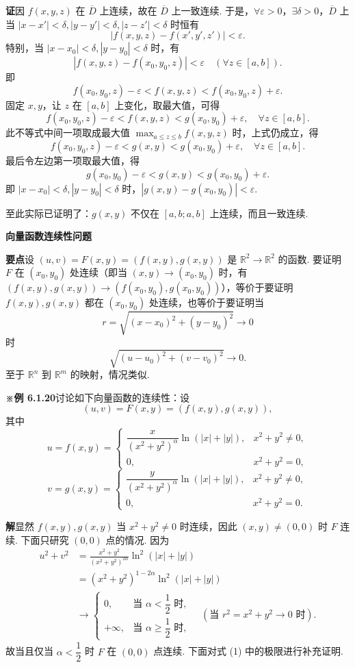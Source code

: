 \documentclass[UTF8,12pt,a4paper,fontset=fandol]{ctexart}
\begin{document}
\noindent\textbf{证}\quad 因 $f(x,y,z)$ 在 $\overline D$ 上连续，故在 $\overline D$ 上一致连续. 于是，$\forall\varepsilon>0$，$\exists\delta>0$，$\overline D$ 上当 $|x-x'|<\delta,|y-y'|<\delta,|z-z'|<\delta$ 时恒有
\[
  |f(x,y,z)-f(x',y',z')|<\varepsilon.
\]
特别，当 $|x-x_0|<\delta,|y-y_0|<\delta$ 时，有
\[
  |f(x,y,z)-f(x_0,y_0,z)|<\varepsilon\quad(\forall z\in[a,b]).
\]
即
\[
  f(x_0,y_0,z)-\varepsilon<f(x,y,z)<f(x_0,y_0,z)+\varepsilon.
\]
固定 $x,y$，让 $z$ 在 $[a,b]$ 上变化，取最大值，可得
\[
  f(x_0,y_0,z)-\varepsilon<f(x,y,z)<g(x_0,y_0)+\varepsilon,
  \quad \forall z\in[a,b].
\]
此不等式中间一项取成最大值 $\displaystyle\max_{a\le z\le b}f(x,y,z)$ 时，上式仍成立，得
\[
  f(x_0,y_0,z)-\varepsilon<g(x,y)<g(x_0,y_0)+\varepsilon,\quad \forall z\in[a,b].
\]
最后令左边第一项取最大值，得
\[
  g(x_0,y_0)-\varepsilon<g(x,y)<g(x_0,y_0)+\varepsilon.
\]
即 $|x-x_0|<\delta,|y-y_0|<\delta$ 时，$|g(x,y)-g(x_0,y_0)|<\varepsilon$.

至此实际已证明了：$g(x,y)$ 不仅在 $[a,b;a,b]$ 上连续，而且一致连续.

\noindent\textbf{向量函数连续性问题}

\noindent\textbf{要点}\quad 设 $(u,v)=F(x,y)=(f(x,y),g(x,y))$ 是 $\mathbb{R}^2\to\mathbb{R}^2$ 的函数. 要证明 $F$ 在 $(x_0,y_0)$ 处连续（即当 $(x,y)\to(x_0,y_0)$ 时，有 $(f(x,y),g(x,y))\to(f(x_0,y_0),g(x_0,y_0))$），等价于要证明 $f(x,y),g(x,y)$ 都在 $(x_0,y_0)$ 处连续，也等价于要证明当
\[
  r=\sqrt{(x-x_0)^2+(y-y_0)^2}\to0
\]
时
\[
  \sqrt{(u-u_0)^2+(v-v_0)^2}\to0.
\]
至于 $\mathbb{R}^n$ 到 $\mathbb{R}^m$ 的映射，情况类似.

\noindent\textbf{※例 6.1.20}\quad 讨论如下向量函数的连续性：设
\[
  (u,v)=F(x,y)=(f(x,y),g(x,y)),
\]
其中
\[
u=f(x,y)=
\begin{cases}
\dfrac{x}{(x^2+y^2)^\alpha}\ln(|x|+|y|), & x^2+y^2\ne0,\\
0, & x^2+y^2=0,
\end{cases}
\]
\[
v=g(x,y)=
\begin{cases}
\dfrac{y}{(x^2+y^2)^\alpha}\ln(|x|+|y|), & x^2+y^2\ne0,\\
0, & x^2+y^2=0.
\end{cases}
\]

\noindent\textbf{解}\quad 显然 $f(x,y),g(x,y)$ 当 $x^2+y^2\ne0$ 时连续，因此 $(x,y)\ne(0,0)$ 时 $F$ 连续. 下面只研究 $(0,0)$ 点的情况. 因为
\begin{equation}
\begin{aligned}
u^2+v^2
&=\frac{x^2+y^2}{(x^2+y^2)^{2\alpha}}\ln^2(|x|+|y|)\\
&=(x^2+y^2)^{1-2\alpha}\ln^2(|x|+|y|)\\
&\to
\begin{cases}
0, & \text{当 }\alpha<\dfrac12\text{ 时},\\
+\infty, & \text{当 }\alpha\ge\dfrac12\text{ 时},
\end{cases}
\quad(\text{当 }r^2=x^2+y^2\to0\text{ 时}).
\end{aligned}
\tag{1}
\end{equation}
故当且仅当 $\alpha<\dfrac12$ 时 $F$ 在 $(0,0)$ 点连续. 下面对式 (1) 中的极限进行补充证明.
\end{document}
